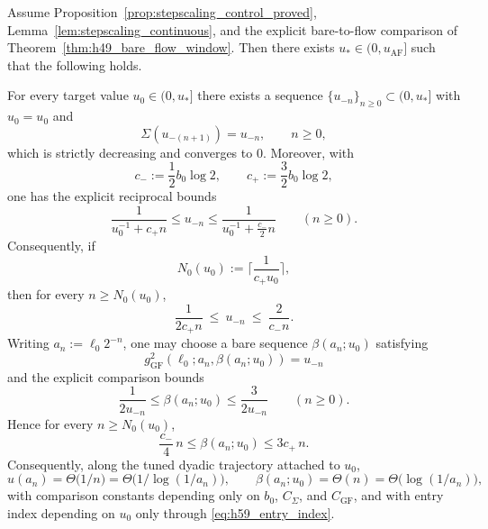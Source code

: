 \begin{proposition}\label{prop:h59_uv_tuning_exists}
Assume Proposition~\ref{prop:stepscaling_control_proved}, Lemma~\ref{lem:stepscaling_continuous}, and the explicit bare-to-flow comparison of Theorem~\ref{thm:h49_bare_flow_window}.
Then there exists $u_\ast\in(0,u_{\mathrm{AF}}]$ such that the following holds.

For every target value $u_0\in(0,u_\ast]$ there exists a sequence $\{u_{-n}\}_{n\ge0}\subset(0,u_\ast]$ with $u_{0}=u_0$ and
\begin{equation}
\label{eq:h59_backward_recursion}
\Sigma(u_{-(n+1)})=u_{-n},\qquad n\ge0,
\end{equation}
which is strictly decreasing and converges to $0$.
Moreover, with
\[
 c_-:=\frac12 b_0\log 2,
 \qquad
 c_+:=\frac32 b_0\log 2,
\]
one has the explicit reciprocal bounds
\begin{equation}\label{eq:h59_u_explicit_bounds}
\frac{1}{u_0^{-1}+c_+ n}
\le
u_{-n}
\le
\frac{1}{u_0^{-1}+\frac{c_-}{2}n}
\qquad (n\ge 0).
\end{equation}
Consequently, if
\begin{equation}\label{eq:h59_entry_index}
N_0(u_0):=\Big\lceil \frac{1}{c_+u_0}\Big\rceil,
\end{equation}
then for every $n\ge N_0(u_0)$,
\begin{equation}\label{eq:h59_un_over_n}
\frac{1}{2c_+ n}\ \le\ u_{-n}\ \le\ \frac{2}{c_- n}.
\end{equation}
Writing $a_n:=\ell_0 2^{-n}$, one may choose a bare sequence $\beta(a_n;u_0)$ satisfying
\begin{equation}\label{eq:h59_beta_exact_match}
 g_{\mathrm{GF}}^2(\ell_0;a_n,\beta(a_n;u_0))=u_{-n}
\end{equation}
and the explicit comparison bounds
\begin{equation}\label{eq:h59_beta_vs_u_bounds}
 \frac{1}{2u_{-n}}
 \le
 \beta(a_n;u_0)
 \le
 \frac{3}{2u_{-n}}
 \qquad (n\ge 0).
\end{equation}
Hence for every $n\ge N_0(u_0)$,
\begin{equation}\label{eq:h59_beta_vs_n_bounds}
 \frac{c_-}{4}\,n
 \le
 \beta(a_n;u_0)
 \le
 3c_+\,n.
\end{equation}
Consequently, along the tuned dyadic trajectory attached to $u_0$,
\[
 u(a_n)=\Theta\!\big(1/n\big)=\Theta\!\big(1/\log(1/a_n)\big),
 \qquad
 \beta(a_n;u_0)=\Theta(n)=\Theta\!\big(\log(1/a_n)\big),
\]
with comparison constants depending only on $b_0$, $C_\Sigma$, and $C_{\mathrm{GF}}$, and with entry index depending on $u_0$ only through \eqref{eq:h59_entry_index}.
\end{proposition}

